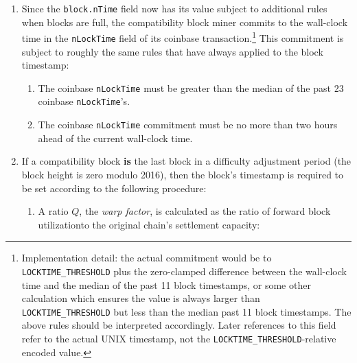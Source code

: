 \begin{enumerate}
\begin{enumerate}
  \item

    Since the {\tt block.nTime} field now has its value subject to
    additional rules when blocks are full, the compatibility block
    miner commits to the wall-clock time in the {\tt nLockTime} field
    of its coinbase transaction.\footnote{Implementation detail: the
    actual commitment would be to {\tt LOCKTIME\_THRESHOLD} plus the
    zero-clamped difference between the wall-clock time and the median
    of the past \num{11} block timestamps, or some other calculation
    which ensures the value is always larger than {\tt
    LOCKTIME\_THRESHOLD} but less than the median past \num{11} block
    timestamps.  The above rules should be interpreted accordingly.
    Later references to this field refer to the actual UNIX timestamp,
    not the {\tt LOCKTIME\_THRESHOLD}-relative encoded value.}  This
    commitment is subject to roughly the same rules that have always
    applied to the block timestamp:

    \begin{enumerate}

      \item

        The coinbase {\tt nLockTime} must be greater than the median
        of the past \num{23} coinbase {\tt nLockTime}'s.\footnotemark

      \item

        The coinbase {\tt nLockTime} commitment must be no more than
        two hours ahead of the current wall-clock time.

    \end{enumerate}


  \item

    If a compatibility block \textbf{is} the last block in a
    difficulty adjustment period (the block height is zero
    modulo \num{2016}), then the block's timestamp is required to be
    set according to the following procedure:

    \begin{enumerate}

      \item

        A ratio $Q$, the \emph{warp factor}, is calculated as the
        ratio of forward block utilization\footnotemark to the
        original chain's settlement capacity:


\end{enumerate}
\end{enumerate}
\end{enumerate}
